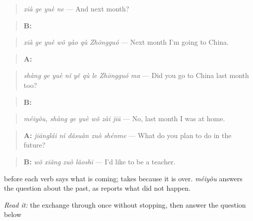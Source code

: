\begin{quote}
\emph{xià ge yuè ne} — And next month?
\end{quote}

\begin{quote}
\textbf{B:} 
\end{quote}

\begin{quote}
\emph{xià ge yuè wǒ yào qù Zhōngguó} — Next month I'm going to China.
\end{quote}

\begin{quote}
\textbf{A:} 
\end{quote}

\begin{quote}
\emph{shàng ge yuè nǐ yě qù le Zhōngguó ma} — Did you go to China last month too?
\end{quote}

\begin{quote}
\textbf{B:}  
\end{quote}

\begin{quote}
\emph{méiyǒu, shàng ge yuè wǒ zài jiā} — No, last month I was at home.
\end{quote}

\begin{quote}
\textbf{A:} \emph{jiānglái nǐ dǎsuàn zuò shénme} — What do you plan to do in the future?
\end{quote}

\begin{quote}
\textbf{B:} \emph{wǒ xiǎng zuò lǎoshī} — I'd like to be a teacher.
\end{quote}

 before each verb says what is coming;  takes  because it is over. \emph{méiyǒu} answers the question about the past, as  reports what did not happen.

\begin{tcolorbox}[breakable,skin=enhanced,colback=orange!6,colframe=orange!45!black,boxrule=0.5pt,arc=1mm,left=6pt,right=6pt,top=4pt,bottom=4pt,fonttitle=\bfseries,title={Read this}]
\emph{Read it:} the exchange through once without stopping, then answer the question below
\end{tcolorbox}


